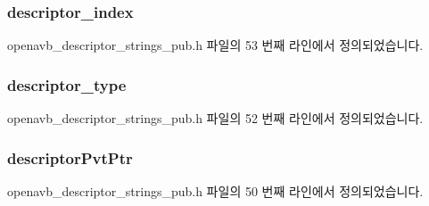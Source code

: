 \subsubsection[{\texorpdfstring{descriptor\+\_\+index}{descriptor_index}}]{ descriptor\+\_\+index}\hypertarget{structopenavb__aem__descriptor__strings__t_ab26fb363c24b9a2a4391f9171c981b08}{}\label{structopenavb__aem__descriptor__strings__t_ab26fb363c24b9a2a4391f9171c981b08}


openavb\+\_\+descriptor\+\_\+strings\+\_\+pub.\+h 파일의 53 번째 라인에서 정의되었습니다.

\subsubsection[{\texorpdfstring{descriptor\+\_\+type}{descriptor_type}}]{ descriptor\+\_\+type}\hypertarget{structopenavb__aem__descriptor__strings__t_a1e231d7874aada5925b29affc76782cc}{}\label{structopenavb__aem__descriptor__strings__t_a1e231d7874aada5925b29affc76782cc}


openavb\+\_\+descriptor\+\_\+strings\+\_\+pub.\+h 파일의 52 번째 라인에서 정의되었습니다.

\subsubsection[{\texorpdfstring{descriptor\+Pvt\+Ptr}{descriptorPvtPtr}}]{ descriptor\+Pvt\+Ptr}\hypertarget{structopenavb__aem__descriptor__strings__t_a302e92fd6cf4d398d5305395359fb157}{}\label{structopenavb__aem__descriptor__strings__t_a302e92fd6cf4d398d5305395359fb157}


openavb\+\_\+descriptor\+\_\+strings\+\_\+pub.\+h 파일의 50 번째 라인에서 정의되었습니다.

